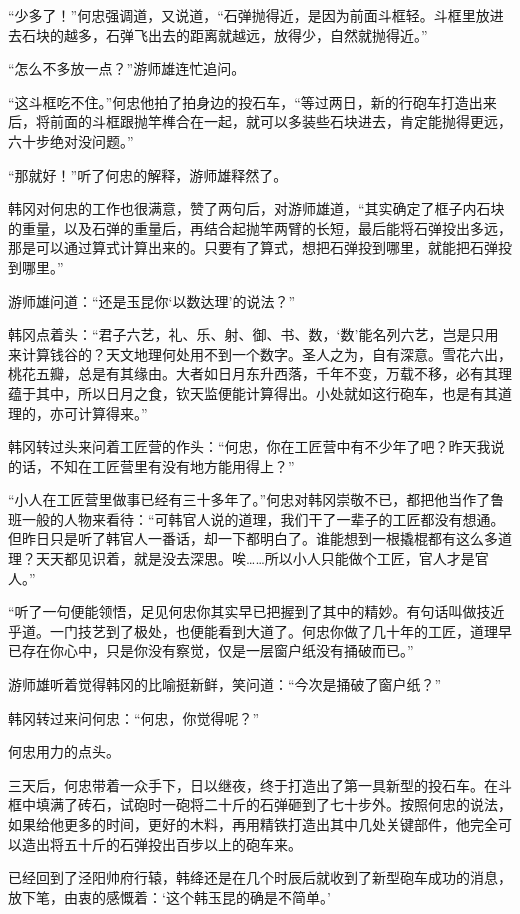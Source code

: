“少多了！”何忠强调道，又说道，“石弹抛得近，是因为前面斗框轻。斗框里放进去石块的越多，石弹飞出去的距离就越远，放得少，自然就抛得近。”

“怎么不多放一点？”游师雄连忙追问。

“这斗框吃不住。”何忠他拍了拍身边的投石车，“等过两日，新的行砲车打造出来后，将前面的斗框跟抛竿榫合在一起，就可以多装些石块进去，肯定能抛得更远，六十步绝对没问题。”

“那就好！”听了何忠的解释，游师雄释然了。

韩冈对何忠的工作也很满意，赞了两句后，对游师雄道，“其实确定了框子内石块的重量，以及石弹的重量后，再结合起抛竿两臂的长短，最后能将石弹投出多远，那是可以通过算式计算出来的。只要有了算式，想把石弹投到哪里，就能把石弹投到哪里。”

游师雄问道：“还是玉昆你‘以数达理’的说法？”

韩冈点着头：“君子六艺，礼、乐、射、御、书、数，‘数’能名列六艺，岂是只用来计算钱谷的？天文地理何处用不到一个数字。圣人之为，自有深意。雪花六出，桃花五瓣，总是有其缘由。大者如日月东升西落，千年不变，万载不移，必有其理蕴于其中，所以日月之食，钦天监便能计算得出。小处就如这行砲车，也是有其道理的，亦可计算得来。”

韩冈转过头来问着工匠营的作头：“何忠，你在工匠营中有不少年了吧？昨天我说的话，不知在工匠营里有没有地方能用得上？”

“小人在工匠营里做事已经有三十多年了。”何忠对韩冈崇敬不已，都把他当作了鲁班一般的人物来看待：“可韩官人说的道理，我们干了一辈子的工匠都没有想通。但昨日只是听了韩官人一番话，却一下都明白了。谁能想到一根撬棍都有这么多道理？天天都见识着，就是没去深思。唉……所以小人只能做个工匠，官人才是官人。”

“听了一句便能领悟，足见何忠你其实早已把握到了其中的精妙。有句话叫做技近乎道。一门技艺到了极处，也便能看到大道了。何忠你做了几十年的工匠，道理早已存在你心中，只是你没有察觉，仅是一层窗户纸没有捅破而已。”

游师雄听着觉得韩冈的比喻挺新鲜，笑问道：“今次是捅破了窗户纸？”

韩冈转过来问何忠：“何忠，你觉得呢？”

何忠用力的点头。

三天后，何忠带着一众手下，日以继夜，终于打造出了第一具新型的投石车。在斗框中填满了砖石，试砲时一砲将二十斤的石弹砸到了七十步外。按照何忠的说法，如果给他更多的时间，更好的木料，再用精铁打造出其中几处关键部件，他完全可以造出将五十斤的石弹投出百步以上的砲车来。

已经回到了泾阳帅府行辕，韩绛还是在几个时辰后就收到了新型砲车成功的消息，放下笔，由衷的感慨着：‘这个韩玉昆的确是不简单。’


